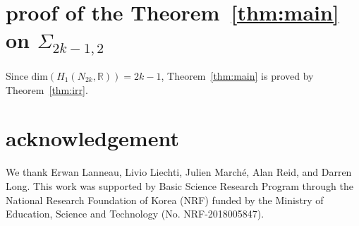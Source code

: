 \documentclass{amsart}
\theoremstyle{definition}
\theoremstyle{remark}
\begin{document}
\section{proof of the Theorem~\ref{thm:main} on $\Sigma_{2k-1,2}$}

Since $\text{dim}(H_1(N_{2k},\mathbb{R}))=2k-1$, Theorem~\ref{thm:main} is proved by Theorem~\ref{thm:irr}.
\section{acknowledgement}
We thank Erwan Lanneau, Livio Liechti, Julien Marché, Alan Reid, and Darren Long. 
This work was supported by Basic Science Research Program through the National Research Foundation of Korea (NRF) funded by the Ministry of Education, Science and Technology (No. NRF-2018005847). %
%
%
\providecommand{\bysame}{\leavevmode\hbox to3em{\hrulefill}\thinspace}
\providecommand{\MR}{\relax\ifhmode\unskip\space\fi MR }
\providecommand{\MRhref}[2]{%
  \href{http://www.ams.org/mathscinet-getitem?mr=#1}{#2}
}
\providecommand{\href}[2]{#2}
\end{document}
